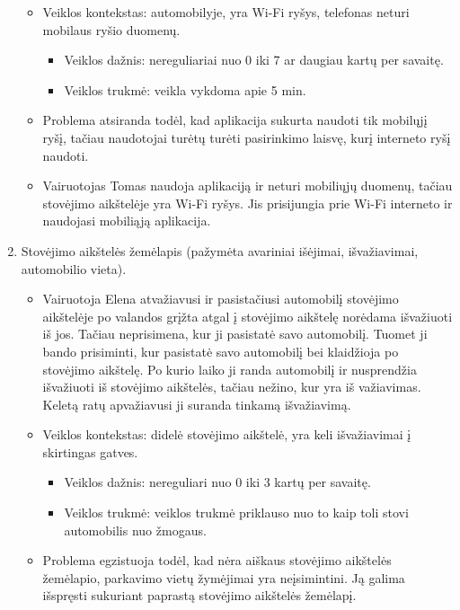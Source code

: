 \documentclass{VUMIFPSkursinis}
\begin{document}
\begin{enumerate}[label = \textbf{PV\arabic*.}]
\begin{itemize}[label={-}]
			\item Veiklos kontekstas: automobilyje, yra Wi-Fi ryšys, telefonas neturi mobilaus ryšio duomenų.
				\begin{itemize}[label={$\bullet$}]
					\item Veiklos dažnis: nereguliariai nuo 0 iki 7 ar daugiau kartų per savaitę.
					\item Veiklos trukmė:  veikla vykdoma apie 5 min.
				\end{itemize}
			\item Problema atsiranda todėl, kad aplikacija sukurta naudoti tik mobilųjį ryšį, tačiau naudotojai turėtų turėti pasirinkimo laisvę, kurį interneto ryšį naudoti.
			
			\item Vairuotojas Tomas naudoja aplikaciją ir neturi mobiliųjų duomenų, tačiau stovėjimo aikštelėje yra Wi-Fi ryšys. Jis prisijungia prie Wi-Fi interneto ir naudojasi mobiliąją aplikacija.
		\end{itemize}
	\item Stovėjimo aikštelės žemėlapis (pažymėta avariniai išėjimai, išvažiavimai, automobilio vieta).
		\begin{itemize}[label={-}]
			\item Vairuotoja Elena atvažiavusi ir pasistačiusi automobilį stovėjimo aikštelėje po valandos grįžta atgal į stovėjimo aikštelę norėdama išvažiuoti iš jos. Tačiau neprisimena, kur ji pasistatė savo automobilį. Tuomet ji bando prisiminti, kur pasistatė savo automobilį bei klaidžioja po stovėjimo aikštelę. Po kurio laiko ji randa automobilį ir nusprendžia išvažiuoti iš stovėjimo aikštelės, tačiau nežino, kur yra iš važiavimas. Keletą ratų apvažiavusi ji suranda tinkamą išvažiavimą.

			\item Veiklos kontekstas: didelė stovėjimo aikštelė, yra keli išvažiavimai į skirtingas gatves.
				\begin{itemize}[label={$\bullet$}]
					\item Veiklos dažnis: nereguliari nuo 0 iki 3 kartų per savaitę.
					\item Veiklos trukmė: veiklos trukmė priklauso nuo to kaip toli stovi automobilis nuo žmogaus.
				\end{itemize}
			\item Problema egzistuoja todėl, kad nėra aiškaus stovėjimo aikštelės žemėlapio, parkavimo vietų žymėjimai yra neįsimintini. Ją galima išspręsti sukuriant paprastą stovėjimo aikštelės žemėlapį.


\end{itemize}
\end{enumerate}
\end{document}
